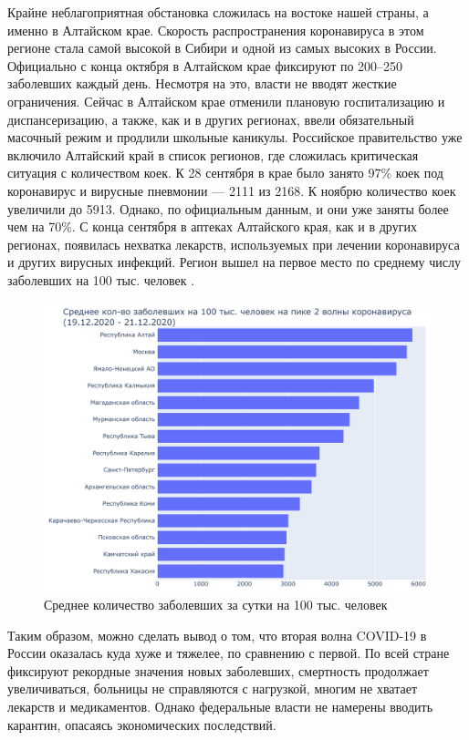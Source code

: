 \documentclass[a4paper, 12pt]{extarticle}
\begin{document}
Крайне неблагоприятная обстановка сложилась на востоке нашей страны, а именно в Алтайском крае. Скорость распространения коронавируса в этом регионе стала самой высокой в Сибири и одной из самых высоких в России. Официально с конца октября в Алтайском крае фиксируют по 200–250 заболевших каждый день. Несмотря на это, власти не вводят жесткие ограничения. Сейчас в Алтайском крае отменили плановую госпитализацию и диспансеризацию, а также, как и в других регионах, ввели обязательный масочный режим и продлили школьные каникулы. Российское правительство уже включило Алтайский край в список регионов, где сложилась критическая ситуация с количеством коек. К 28 сентября в крае было занято 97\% коек под коронавирус и вирусные пневмонии — 2111 из 2168. К ноябрю количество коек увеличили до 5913. Однако, по официальным данным, и они уже заняты более чем на 70\%. С конца сентября в аптеках Алтайского края, как и в других регионах, появилась нехватка лекарств, используемых при лечении коронавируса и других вирусных инфекций. Регион вышел на первое место по среднему числу заболевших на 100 тыс. человек .

\begin{figure}[h]
    \centering
    \includegraphics[scale=0.6]{../plots/6total_confirmed_per_100k_bar_plot_2wave.pdf}
    \caption{Среднее количество заболевших за сутки на 100 тыс. человек}
    \label{fig:average_confirmed_per_100k_2wave}
\end{figure}

Таким образом, можно сделать вывод о том, что вторая волна COVID-19 в России оказалась куда хуже и тяжелее, по сравнению с первой. По всей стране фиксируют рекордные значения новых заболевших, смертность продолжает увеличиваться, больницы не справляются с нагрузкой, многим не хватает лекарств и медикаментов. Однако федеральные власти не намерены вводить карантин, опасаясь экономических последствий.
\newpage
\end{document}

